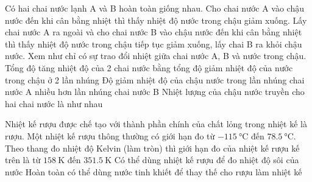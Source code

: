 \begin{ex}
	Có hai chai nước lạnh A và B hoàn toàn giống nhau. Cho chai nước A vào chậu nước đến khi cân bằng nhiệt thì thấy nhiệt độ nước trong chậu giảm xuống. Lấy chai nước A ra ngoài và cho chai nước B vào chậu nước đến khi cân bằng nhiệt thì thấy nhiệt độ nước trong chậu tiếp tục giảm xuống, lấy chai B ra khỏi chậu nước. Xem như chỉ có sự trao đổi nhiệt giữa chai nước A, B và nước trong chậu.
	{Tổng độ tăng nhiệt độ của 2 chai nước bằng tổng độ giảm nhiệt độ của nước trong chậu ở 2 lần nhúng}
	{\True Độ giảm nhiệt độ của chậu nước trong lần nhúng chai nước A nhiều hơn lần nhúng chai nước	B}
	{Nhiệt lượng của chậu nước truyền cho hai chai nước là như nhau}
\end{ex}
\begin{ex}
	Nhiệt kế rượu được chế tạo với thành phần chính của chất lỏng trong nhiệt kế là rượu. Một nhiệt kế rượu thông thường có giới hạn đo từ $\SI{-115}{\celsius}$ đến $\SI{78,5}{\celsius}$.
{\True Theo thang đo nhiệt độ Kelvin (làm tròn) thì giới hạn đo của nhiệt kế rượu kế trên là từ $\SI{158}{\kelvin}$ đến $\SI{351.5}{\kelvin}$}
{Có thể dùng nhiệt kế rượu để đo nhiệt độ sôi của nước}
{Hoàn toàn có thể dùng nước tinh khiết để thay thế cho rượu làm nhiệt kế}
\loigiai{}
\end{ex}

